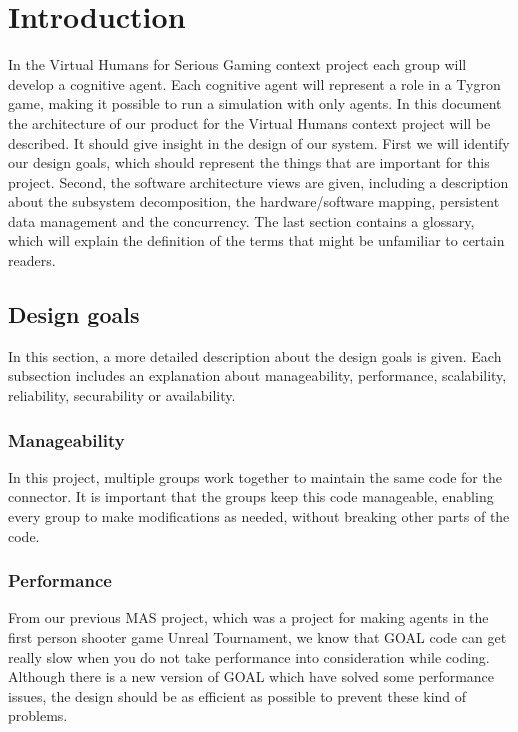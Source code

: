\section{Introduction}

In the Virtual Humans for Serious Gaming context project each group will develop a cognitive agent. Each cognitive agent will represent a role in a Tygron game, making it possible to run a simulation with only agents. In this document the architecture of our product for the Virtual Humans context project will be described. It should give insight in the design of our system. First we will identify our design goals, which should represent the things that are important for this project. Second, the software architecture views are given, including a description about the subsystem decomposition, the hardware/software mapping, persistent data management and the concurrency. The last section contains a glossary, which will explain the definition of the terms that might be unfamiliar to certain readers.


\subsection{Design goals}
In this section, a more detailed description about the design goals is given. Each subsection includes an explanation about manageability, performance, scalability, reliability, securability or availability.

\subsubsection*{Manageability}
In this project, multiple groups work together to maintain the same code for the connector. It is important that the groups keep this code manageable, enabling every group to make modifications as needed, without breaking other parts of the code.

\subsubsection*{Performance}
From our previous MAS project, which was a project for making agents in the first person shooter game Unreal Tournament, we know that GOAL code can get really slow when you do not take performance into consideration while coding. Although there is a new version of GOAL which have solved some performance issues, the design should be as efficient as possible to prevent these kind of problems.


